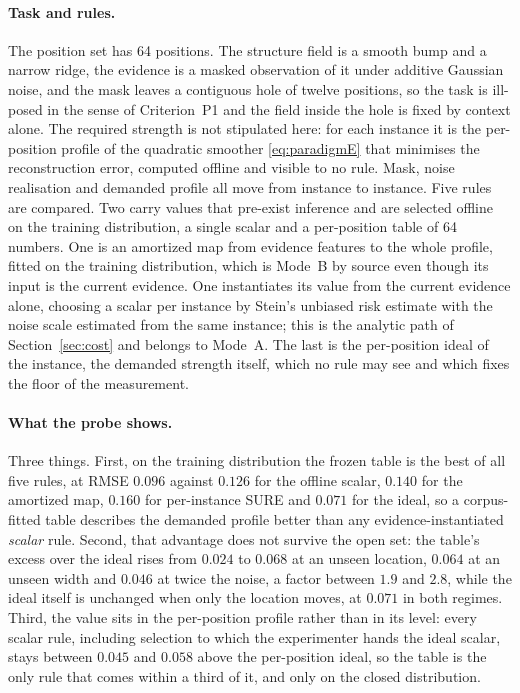 \paragraph{Task and rules.} The position set has 64 positions. The structure field is a smooth bump and a narrow ridge, the evidence is a masked observation of it under additive Gaussian noise, and the mask leaves a contiguous hole of twelve positions, so the task is ill-posed in the sense of Criterion~P1 and the field inside the hole is fixed by context alone. The required strength is not stipulated here: for each instance it is the per-position profile of the quadratic smoother \eqref{eq:paradigmE} that minimises the reconstruction error, computed offline and visible to no rule. Mask, noise realisation and demanded profile all move from instance to instance. Five rules are compared. Two carry values that pre-exist inference and are selected offline on the training distribution, a single scalar and a per-position table of 64 numbers. One is an amortized map from evidence features to the whole profile, fitted on the training distribution, which is Mode~B by source even though its input is the current evidence. One instantiates its value from the current evidence alone, choosing a scalar per instance by Stein's unbiased risk estimate with the noise scale estimated from the same instance; this is the analytic path of Section~\ref{sec:cost} and belongs to Mode~A. The last is the per-position ideal of the instance, the demanded strength itself, which no rule may see and which fixes the floor of the measurement.

\paragraph{What the probe shows.} Three things. First, on the training distribution the frozen table is the best of all five rules, at RMSE $0.096$ against $0.126$ for the offline scalar, $0.140$ for the amortized map, $0.160$ for per-instance SURE and $0.071$ for the ideal, so a corpus-fitted table describes the demanded profile better than any evidence-instantiated \emph{scalar} rule. Second, that advantage does not survive the open set: the table's excess over the ideal rises from $0.024$ to $0.068$ at an unseen location, $0.064$ at an unseen width and $0.046$ at twice the noise, a factor between $1.9$ and $2.8$, while the ideal itself is unchanged when only the location moves, at $0.071$ in both regimes. Third, the value sits in the per-position profile rather than in its level: every scalar rule, including selection to which the experimenter hands the ideal scalar, stays between $0.045$ and $0.058$ above the per-position ideal, so the table is the only rule that comes within a third of it, and only on the closed distribution.

